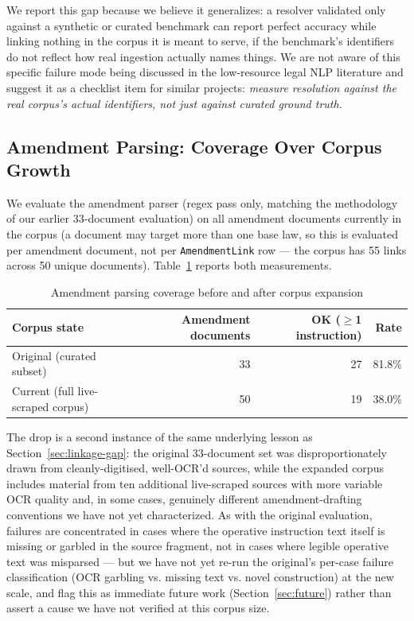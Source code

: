 \documentclass{IOS-Book-Article}
\begin{document}
We report this gap because we believe it generalizes: a resolver validated only against a
synthetic or curated benchmark can report perfect accuracy while linking nothing in the
corpus it is meant to serve, if the benchmark's identifiers do not reflect how real
ingestion actually names things. We are not aware of this specific failure mode being
discussed in the low-resource legal NLP literature and suggest it as a checklist item for
similar projects: \emph{measure resolution against the real corpus's actual identifiers, not just
against curated ground truth.}

\subsection{Amendment Parsing: Coverage Over Corpus Growth}
\label{sec:parsing-eval}

We evaluate the amendment parser (regex pass only, matching the methodology of our earlier
33-document evaluation) on all amendment documents currently in the corpus (a document may
target more than one base law, so this is evaluated per amendment document, not per
\texttt{AmendmentLink} row --- the corpus has 55 links across 50 unique documents). Table~\ref{tab:parsing}
reports both measurements.

\begin{table}[h]
\caption{Amendment parsing coverage before and after corpus expansion}
\label{tab:parsing}
\begin{tabular}{|l|r|r|r|}
\hline
\textbf{Corpus state} & \textbf{Amendment documents} & \textbf{OK ($\geq$1 instruction)} & \textbf{Rate} \\
\hline
Original (curated subset) & 33 & 27 & 81.8\% \\
Current (full live-scraped corpus) & 50 & 19 & 38.0\% \\
\hline
\end{tabular}
\end{table}

The drop is a second instance of the same underlying lesson as Section~\ref{sec:linkage-gap}: the original
33-document set was disproportionately drawn from cleanly-digitised, well-OCR'd sources, while
the expanded corpus includes material from ten additional live-scraped sources with more
variable OCR quality and, in some cases, genuinely different amendment-drafting
conventions we have not yet characterized. As with the original evaluation, failures are
concentrated in cases where the operative instruction text itself is missing or garbled in
the source fragment, not in cases where legible operative text was misparsed --- but we have
not yet re-run the original's per-case failure classification (OCR garbling vs. missing
text vs. novel construction) at the new scale, and flag this as immediate future work
(Section~\ref{sec:future}) rather than assert a cause we have not verified at this corpus size.
\end{document}

